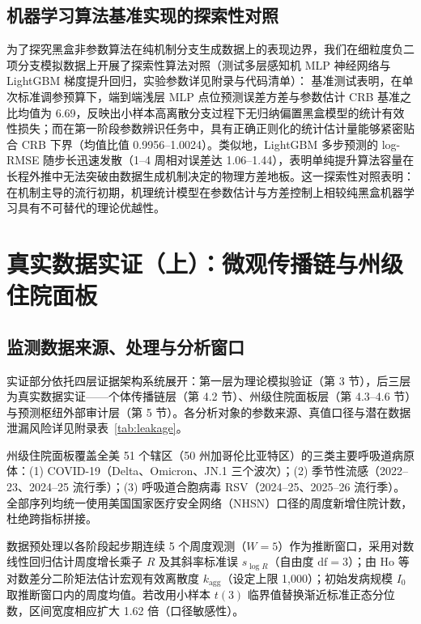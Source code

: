 \documentclass[10pt,a4paper]{article}
\theoremstyle{plain}
\theoremstyle{definition}
\begin{document}



\subsection{机器学习算法基准实现的探索性对照}\label{sec:ml}

为了探究黑盒非参数算法在纯机制分支生成数据上的表现边界，我们在细粒度负二项分支模拟数据上开展了探索性算法对照（测试多层感知机 MLP 神经网络与 LightGBM 梯度提升回归，实验参数详见附录与代码清单）：
基准测试表明，在单次标准调参预算下，端到端浅层 MLP 点位预测误差方差与参数估计 CRB 基准之比均值为 6.69，反映出小样本高离散分支过程下无归纳偏置黑盒模型的统计有效性损失；而在第一阶段参数辨识任务中，具有正确正则化的统计估计量能够紧密贴合 CRB 下界（均值比值 0.9956--1.0024）。类似地，LightGBM 多步预测的 log-RMSE 随步长迅速发散（1--4 周相对误差达 1.06--1.44），表明单纯提升算法容量在长程外推中无法突破由数据生成机制决定的物理方差地板。这一探索性对照表明：在机制主导的流行初期，机理统计模型在参数估计与方差控制上相较纯黑盒机器学习具有不可替代的理论优越性。

\section{真实数据实证（上）：微观传播链与州级住院面板}\label{sec:empirical}

\subsection{监测数据来源、处理与分析窗口}\label{sec:data}

实证部分依托四层证据架构系统展开：第一层为理论模拟验证（第 3 节），后三层为真实数据实证——个体传播链层（第 4.2 节）、州级住院面板层（第 4.3--4.6 节）与预测枢纽外部审计层（第 5 节）。各分析对象的参数来源、真值口径与潜在数据泄漏风险详见附录表~\ref{tab:leakage}。

州级住院面板覆盖全美 51 个辖区（50 州加哥伦比亚特区）的三类主要呼吸道病原体：(1) COVID-19（Delta、Omicron、JN.1 三个波次）；(2) 季节性流感（2022--23、2024--25 流行季）；(3) 呼吸道合胞病毒 RSV（2024--25、2025--26 流行季）。全部序列均统一使用美国国家医疗安全网络（NHSN）口径的周度新增住院计数，杜绝跨指标拼接。

数据预处理以各阶段起步期连续 5 个周度观测（$W=5$）作为推断窗口，采用对数线性回归估计周度增长乘子 $R$ 及其斜率标准误 $s_{\log R}$（自由度 $\text{df}=3$）；由 Ho 等\citep{ho2023simultaneous} 对数差分二阶矩法估计宏观有效离散度 $k_{\text{agg}}$（设定上限 1,000）；初始发病规模 $I_0$ 取推断窗口内的周度均值。若改用小样本 $t(3)$ 临界值替换渐近标准正态分位数，区间宽度相应扩大 1.62 倍（口径敏感性）。
\end{document}
